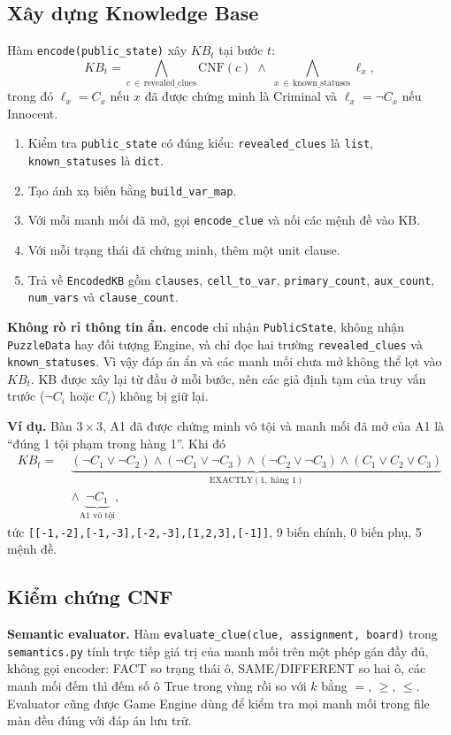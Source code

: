 \subsection{Xây dựng Knowledge Base}
Hàm \texttt{encode(public\_state)} xây $KB_t$ tại bước $t$:
\[
KB_t = \bigwedge_{c\,\in\,\text{revealed\_clues}} \mathrm{CNF}(c)
\;\wedge\; \bigwedge_{x\,\in\,\text{known\_statuses}} \ell_x,
\]
trong đó $\ell_x = C_x$ nếu $x$ đã được chứng minh là Criminal và
$\ell_x = \neg C_x$ nếu Innocent.
\begin{enumerate}
    \item Kiểm tra \texttt{public\_state} có đúng kiểu: \texttt{revealed\_clues}
    là \texttt{list}, \texttt{known\_statuses} là \texttt{dict}.
    \item Tạo ánh xạ biến bằng \texttt{build\_var\_map}.
    \item Với mỗi manh mối đã mở, gọi \texttt{encode\_clue} và nối các mệnh
    đề vào KB.
    \item Với mỗi trạng thái đã chứng minh, thêm một unit clause.
    \item Trả về \texttt{EncodedKB} gồm \texttt{clauses}, \texttt{cell\_to\_var},
    \texttt{primary\_count}, \texttt{aux\_count}, \texttt{num\_vars} và
    \texttt{clause\_count}.
\end{enumerate}

\textbf{Không rò rỉ thông tin ẩn.} \texttt{encode} chỉ nhận
\texttt{PublicState}, không nhận \texttt{PuzzleData} hay đối tượng Engine, và
chỉ đọc hai trường \texttt{revealed\_clues} và \texttt{known\_statuses}. Vì vậy
đáp án ẩn và các manh mối chưa mở không thể lọt vào $KB_t$. KB được xây lại
từ đầu ở mỗi bước, nên các giả định tạm của truy vấn trước ($\neg C_i$ hoặc
$C_i$) không bị giữ lại.

\textbf{Ví dụ.} Bàn $3\times3$, A1 đã được chứng minh vô tội và manh mối đã mở
của A1 là ``đúng 1 tội phạm trong hàng 1''. Khi đó
\begin{align*}
KB_t = \;&\underbrace{(\neg C_1\vee\neg C_2)\wedge(\neg C_1\vee\neg C_3)\wedge(\neg C_2\vee\neg C_3)\wedge(C_1\vee C_2\vee C_3)}_{\text{EXACTLY}(1,\ \text{hàng }1)}\\
&\wedge \underbrace{\neg C_1}_{\text{A1 vô tội}},
\end{align*}
tức \texttt{[[-1,-2],[-1,-3],[-2,-3],[1,2,3],[-1]]}, 9 biến chính, 0 biến
phụ, 5 mệnh đề.

\subsection{Kiểm chứng CNF}
\textbf{Semantic evaluator.} Hàm \texttt{evaluate\_clue(clue, assignment, board)}
trong \texttt{semantics.py} tính trực tiếp giá trị của manh mối trên một phép
gán đầy đủ, không gọi encoder: FACT so trạng thái ô, SAME/DIFFERENT so hai ô,
các manh mối đếm thì đếm số ô True trong vùng rồi so với $k$ bằng $=$, $\ge$,
$\le$. Evaluator cũng được Game Engine dùng để kiểm tra mọi manh mối trong
file màn đều đúng với đáp án lưu trữ.


